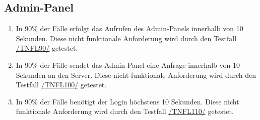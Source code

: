 \subsection*{Admin-Panel}

\begin{samepage}
    \begin{enumerate}[label=\textbf{/NFL\arabic*0/}, align=left, start=9]
        \item \label{/NFL90/} In 90\% der Fälle erfolgt das Aufrufen des \Gls{Admin-Panel}s innerhalb von 10 Sekunden. Diese nicht funktionale Anforderung wird durch den Testfall \hyperref[/TNFL90/]{/TNFL90/} getestet.
        \item \label{/NFL100/} In 90\% der Fälle sendet das \Gls{Admin-Panel} eine Anfrage innerhalb von 10 Sekunden an den \Gls{Server}. Diese nicht funktionale Anforderung wird durch den Testfall \hyperref[/TNFL100/]{/TNFL100/} getestet.
        \item \label{/NFL110/} In 90\% der Fälle benötigt der \Gls{Login} höchstens 10 Sekunden. Diese nicht funktionale Anforderung wird durch den Testfall \hyperref[/TNFL110/]{/TNFL110/} getestet.
    \end{enumerate}
\end{samepage}